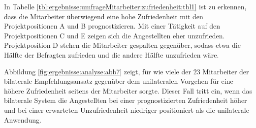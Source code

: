 In Tabelle \ref{tbl:ergebnisse:umfrageMitarbeiter:zufriedenheit:tbl1} ist zu erkennen, dass die Mitarbeiter überwiegend eine hohe Zufriedenheit mit den Projektpositionen A und B prognostizieren. Mit einer Tätigkeit auf den Projektpositionen C und E zeigen sich die Angestellten eher unzufrieden. Projektposition D stehen die Mitarbeiter gespalten gegenüber, sodass etwa die Hälfte der Befragten zufrieden und die andere Hälfte unzufrieden wäre.

Abbildung \ref{fig:ergebnisse:analyse:abb7} zeigt, für wie viele der 23 Mitarbeiter der bilaterale Empfehlungsansatz gegenüber dem unilateralen Vorgehen für eine höhere Zufriedenheit seitens der Mitarbeiter sorgte. Dieser Fall tritt ein, wenn das bilaterale System die Angestellten bei einer prognostizierten Zufriedenheit höher und bei einer erwarteten Unzufriedenheit niedriger positioniert als die unilaterale Anwendung.

